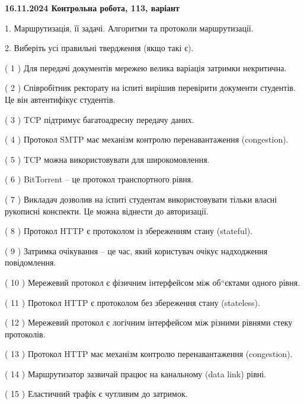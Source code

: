 \documentclass[12pt, ukrainian]{article}
\begin{document}
\vspace{4mm}
\newpage
\begin {large}

\textbf{16.11.2024 Контрольна робота, 113, варіант  }\par


{
1. Маршрутизація, її задачі. Алгоритми та протоколи маршрутизації.



\vspace{5mm}
2. Виберіть усі правильні твердження (якщо такі є).\par
\vspace{2mm}

( 1 ) Для передачі документів мережею велика варіація затримки некритична.

( 2 ) Співробітник ректорату на іспиті вирішив перевірити документи студентів. Це він автентифікує студентів.

( 3 ) TCP підтримує багатоадресну передачу даних.

( 4 ) Протокол SMTP має механізм контролю перенавантаження (congestion).

( 5 ) TCP можна використовувати для широкомовлення.

( 6 ) BitTorrent – це протокол транспортного рівня.

( 7 ) Викладач дозволив на іспиті студентам використовувати тільки власні рукописні конспекти. Це можна віднести до авторизації.

( 8 ) Протокол  HTTP є протоколом із збереженням стану (stateful).

( 9 ) Затримка очікування – це час, який користувач очікує надходження повідомлення.

( 10 ) Мережевий протокол є фізичним інтерфейсом між об“єктами одного рівня.

( 11 ) Протокол  HTTP є протоколом без збереження стану (stateless).

( 12 ) Мережевий протокол є логічним інтерфейсом між різними рівнями стеку протоколів.

( 13 ) Протокол HTTP має механізм контролю перенавантаження (congestion).

( 14 ) Маршрутизатор зазвичай працює на канальному (data link) рівні.

( 15 ) Еластичний трафік є чутливим до затримок.
}
\end {large}
\end{document}
